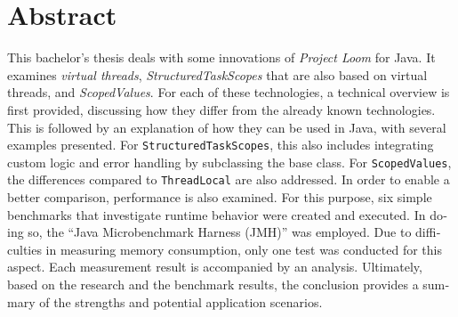 \chapter{Abstract}


\begin{english} %
    This bachelor's thesis deals with some innovations of \emph{Project Loom} for Java. It examines \emph{virtual threads}, \emph{StructuredTaskScopes} that are also based on virtual threads,
    and \emph{ScopedValues}. For each of these technologies, a technical overview is first provided, discussing how they differ from the already known technologies. 
    This is followed by an explanation of how they can be used in Java, with several examples presented. For \texttt{StructuredTaskScopes}, this also includes integrating custom logic and error handling by
    subclassing the base class. For \texttt{ScopedValues}, the differences compared to \texttt{ThreadLocal} are also addressed. In order to enable a better comparison, performance is also examined. 
    For this purpose, six simple benchmarks that investigate runtime behavior were created and executed. In doing so, the “Java Microbenchmark Harness (JMH)” was employed. Due to difficulties in measuring 
    memory consumption, only one test was conducted for this aspect. Each measurement result is accompanied by an analysis. Ultimately, based on the research and the benchmark results, the conclusion provides 
    a summary of the strengths and potential application scenarios.
\end{english}

